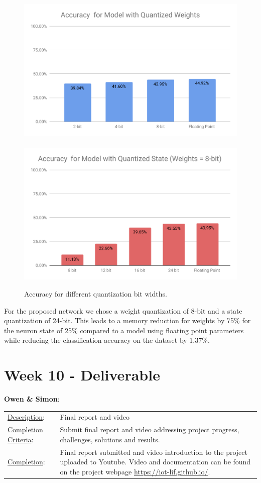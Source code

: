 \documentclass[parskip=true, 10pt]{scrartcl}
\begin{document}
\begin{figure}[!h]
\centering
\includegraphics[width=0.5\columnwidth]{quantized_weight.pdf}~
\includegraphics[width=0.5\columnwidth]{quantized_state.pdf}
\caption{Accuracy for different quantization bit widths.}
\end{figure}

For the proposed network we chose a weight quantization of 8-bit and a state quantization of 24-bit. This leads to a memory reduction for weights by 75\% for the neuron state of 25\% compared to a model using floating point parameters while reducing the classification accuracy on the dataset by 1.37\%.

\section*{Week 10 - Deliverable}

\textbf{\textsf{Owen \& Simon}}:

\begin{tabularx}{\textwidth}{p{3.5cm} p{10cm}}
\underline{Description}: & Final report and video\\

\underline{Completion Criteria}: & Submit final report and video addressing project progress, challenges, solutions and results.\\
\underline{Completion}: &
Final report submitted and video introduction to the project uploaded to Youtube. Video and documentation can be found on the project webpage \url{https://iot-lif.github.io/}.
\end{tabularx}


\nocite{*}


\end{document}
